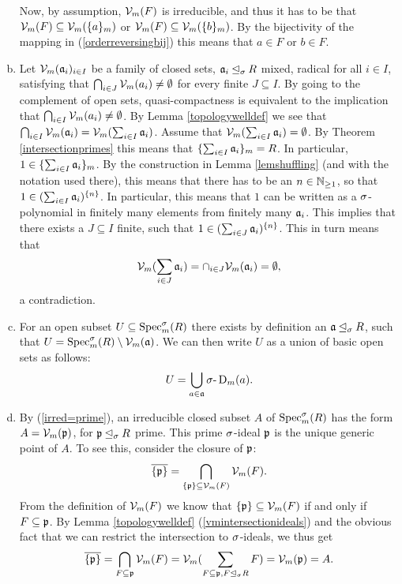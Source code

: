 \begin{prop}
\begin{bew}
\begin{enumerate}[(a)]
Now, by assumption, $\mathcal{V}_m(F)$ is irreducible, and thus it has to be that $\mathcal{V}_m(F) \subseteq \mathcal{V}_m(\{a\}_{m})$ or $\mathcal{V}_m(F) \subseteq \mathcal{V}_m(\{b\}_m)$. By the bijectivity of the mapping in (\ref{orderreversingbij}) this means that $a \in F$ or $b \in F$.
\item Let $\mathcal{V}_m(\mathfrak{a}_i)_{i \in I}$ be a family of closed sets, $\mathfrak{a}_i \unlhd_{\sigma} R$ mixed, radical for all $i \in I$, satisfying that 
$\bigcap_{i \in J} \mathcal{V}_m( a_i) \neq \emptyset$ for every finite $J \subseteq I$. By  going to the complement of open sets, quasi-compactness is equivalent to the implication that $\bigcap_{i \in I} \mathcal{V}_m(a_i) \neq \emptyset$.
By Lemma \ref{topologywelldef} we see that $\bigcap_{i \in I} \mathcal{V}_m( \mathfrak{a}_i) = \mathcal{V}_m ( \sum_{i \in I} \mathfrak{a}_i)$. Assume that $ \mathcal{V}_m ( \sum_{i \in I} \mathfrak{a}_i) = \emptyset$. 
By Theorem \ref{intersectionprimes} this means that $\{ \sum_{i \in I} \mathfrak{a}_i \}_m = R$. In particular, $1 \in \{ \sum_{i \in I} \mathfrak{a}_i \}_m$. By the construction in Lemma \ref{lemshuffling} (and with the notation used there), this means that there has to be an $n \in \mathbb{N}_{\geq1}$,
so that $1 \in (\sum_{i \in I} \mathfrak{a}_i )^{\{n\}}$. In particular, this means that $1$ can be written as a $\sigma$-polynomial in finitely many elements from finitely many $\mathfrak{a}_i$. This implies that there exists a $J \subseteq I$ finite, such that
$1 \in (\sum_{i \in J} \mathfrak{a}_i)^{\{n\}}$. This in turn means that $$\mathcal{V}_m(\sum_{i \in J} \mathfrak{a}_i) = \cap_{i \in J} \mathcal{V}_m(\mathfrak{a}_i) = \emptyset,$$ a contradiction. 
\item For an open subset $U \subseteq \operatorname{Spec}^\sigma_m(R)$ there exists by definition an $\mathfrak{a} \unlhd_{\sigma} R$, such that $U = \operatorname{Spec}^\sigma_m(R) \setminus \mathcal{V}_m(\mathfrak{a})$. We can then write $U$ as a union of basic open sets as follows: $$U = \bigcup_{a \in \mathfrak{a}} \sigma\text{-}\operatorname{D}_m(a).$$
\item By (\ref{irred=prime}), an irreducible closed subset $A$ of $\operatorname{Spec}^\sigma_m(R)$ has the form $A = \mathcal{V}_m(\mathfrak{p})$, for $\mathfrak{p} \unlhd_{\sigma} R$ prime. This prime $\sigma$-ideal $\mathfrak{p}$ is the unique generic point of $A$.
To see this, consider the closure of $\mathfrak{p}$: $$\overline{\{\mathfrak{p}\}} = \bigcap_{\{\mathfrak{p}\} \subseteq \mathcal{V}_m(F)}\mathcal{V}_m(F).$$ From the definition of $\mathcal{V}_m(F)$ we know that $\{\mathfrak{p}\} \subseteq \mathcal{V}_m(F)$ if and only if $F \subseteq \mathfrak{p}$. By Lemma \ref{topologywelldef} (\ref{vmintersectionideals}) and the obvious fact that we can restrict the intersection to $\sigma$-ideals, we thus get
\[ \overline{\{\mathfrak{p}\}} = \bigcap_{F \subseteq \mathfrak{p}}\mathcal{V}_m(F) = \mathcal{V}_m(\sum_{F \subseteq \mathfrak{p}, F \unlhd_{\sigma} R} F) = \mathcal{V}_m(\mathfrak{p}) = A. \]
\end{enumerate}
\end{bew}
\end{prop}

\clearpage
